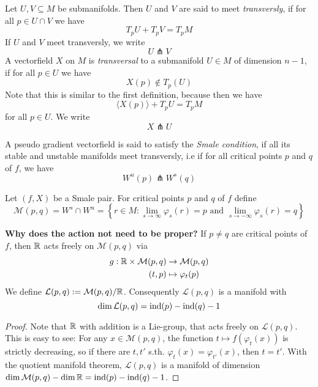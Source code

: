 \begin{definition}[Transversality]
    Let $U, V \subseteq M$ be submanifolds. Then $U$ and $V$ are said to meet 
    \textit{transversly}, if for all $p \in U \cap V$ we have
    \[ T_pU + T_pV = T_pM \]
    If $U$ and $V$ meet transversly, we write
    \[ U \pitchfork V \]
    A vectorfield $X$ on $M$ is \textit{transversal} to a submanifold $U \in M$ of dimension
    $n - 1$, if for all $p \in U$ we have 
    \[ X(p) \notin T_p(U) \]
    Note that this is similar to the first definition, because then we have
    \[ \langle X(p) \rangle + T_pU = T_pM \]
    for all $p \in U$.
    We write 
    \[ X \pitchfork U \]
\end{definition}

\begin{definition}
    A pseudo gradient vectorfield is said to satisfy the \textit{Smale condition}, if
    all its stable and unstable manifolds meet transversly, i.e if for all critical points
    $p$ and $q$ of $f$, we have
    \[ W^u(p) \pitchfork W^s(q) \]
\end{definition}

\begin{prop}
    Let $(f, X)$ be a Smale pair. For critical points $p$ and $q$ of $f$ define
    \[ \mathcal{M}(p, q) = W^s \cap W^u = 
    \left\{ r \in M : \lim_{s \to \infty} \varphi_s(r) = p \text{ and } 
    \lim_{s \to -\infty} \varphi_s(r) = q \right\} \]
\end{prop}

\begin{prop}
    \textbf{Why does the action not need to be proper?}
    If $p \neq q$ are critical points of $f$, then
    ${ \mathbb R }$ acts freely on $\mathcal{M}(p, q)$ via 
    \begin{align*}
        g: { \mathbb R } \times \mathcal{M}(p, q) & \to \mathcal{M}(p, q) \\
        (t, p) & \mapsto \varphi_t(p)
    \end{align*}
    We define $\mathcal{L}(p, q) := \mathcal{M}(p, q)/{ \mathbb R }$. 
    Consequently $\mathcal{L}(p, q)$ is a manifold with 
    \[ \dim \mathcal{L}(p, q)  = { \operatorname{ind} } (p) - { \operatorname{ind} } (q) - 1 \]
\end{prop}

\begin{proof}
    Note that ${ \mathbb R }$ with addition is a Lie-group, that acts freely on $\mathcal{L}(p, q)$. 
    This is easy to see:
    For any $x \in \mathcal{M}(p, q)$, the function $t \mapsto f(\varphi_t(x))$ is strictly
    decreasing, so if there are $t, t'$ s.th. $\varphi_t(x) = \varphi_{t'}(x)$, then
    $t = t'$. With the quotient manifold theorem, $\mathcal{L}(p, q)$ is a manifold of dimension
    $\dim \mathcal{M}(p, q) - \dim { \mathbb R } = { \operatorname{ind} } (p) - { \operatorname{ind} } (q) - 1 $.
\end{proof}

